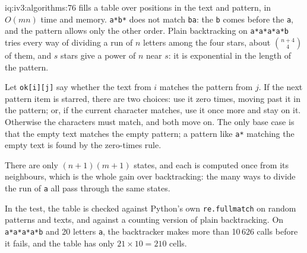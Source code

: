\begin{solution}{iq:iv3:algorithms:76}
 fills a table over positions in the text and pattern, in $O(mn)$ time and memory. \texttt{a*b*} does not match \texttt{ba}: the \texttt{b} comes before the \texttt{a}, and the pattern allows only the other order. Plain backtracking on \texttt{a*a*a*a*b} tries every way of dividing a run of $n$ letters among the four stars, about $\binom{n + 4}{4}$ of them, and $s$ stars give a power of $n$ near $s$: it is exponential in the length of the pattern.
\label{lst:iv3:al:regex}

Let \texttt{ok[i][j]} say whether the text from $i$ matches the pattern from $j$. If the next pattern item is starred, there are two choices: use it zero times, moving past it in the pattern; or, if the current character matches, use it once more and stay on it. Otherwise the characters must match, and both move on. The only base case is that the empty text matches the empty pattern; a pattern like \texttt{a*} matching the empty text is found by the zero-times rule.

There are only $(n + 1)(m + 1)$ states, and each is computed once from its neighbours, which is the whole gain over backtracking: the many ways to divide the run of \texttt{a} all pass through the same states.

In the test, the table is checked against Python's own \texttt{re.fullmatch} on random patterns and texts, and against a counting version of plain backtracking. On \texttt{a*a*a*a*b} and 20 letters \texttt{a}, the backtracker makes more than 10\,626 calls before it fails, and the table has only $21 \times 10 = 210$ cells.

\end{solution}

